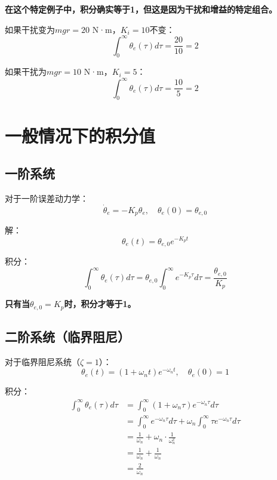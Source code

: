 \documentclass[12pt,a4paper]{article}
\begin{document}
\textbf{在这个特定例子中，积分确实等于1，但这是因为干扰和增益的特定组合。}

如果干扰变为$mgr = 20$ N·m，$K_i = 10$不变：
\begin{equation}
\int_0^{\infty} \theta_e(\tau) d\tau = \frac{20}{10} = 2
\end{equation}

如果干扰为$mgr = 10$ N·m，$K_i = 5$：
\begin{equation}
\int_0^{\infty} \theta_e(\tau) d\tau = \frac{10}{5} = 2
\end{equation}

\section{一般情况下的积分值}

\subsection{一阶系统}

对于一阶误差动力学：
\begin{equation}
\dot{\theta}_e = -K_p \theta_e, \quad \theta_e(0) = \theta_{e,0}
\end{equation}

解：
\begin{equation}
\theta_e(t) = \theta_{e,0} e^{-K_p t}
\end{equation}

积分：
\begin{equation}
\int_0^{\infty} \theta_e(\tau) d\tau = \theta_{e,0} \int_0^{\infty} e^{-K_p \tau} d\tau = \frac{\theta_{e,0}}{K_p}
\end{equation}

\textbf{只有当$\theta_{e,0} = K_p$时，积分才等于1。}

\subsection{二阶系统（临界阻尼）}

对于临界阻尼系统（$\zeta = 1$）：
\begin{equation}
\theta_e(t) = (1 + \omega_n t)e^{-\omega_n t}, \quad \theta_e(0) = 1
\end{equation}

积分：
\begin{align}
\int_0^{\infty} \theta_e(\tau) d\tau &= \int_0^{\infty} (1 + \omega_n \tau)e^{-\omega_n \tau} d\tau \\
&= \int_0^{\infty} e^{-\omega_n \tau} d\tau + \omega_n \int_0^{\infty} \tau e^{-\omega_n \tau} d\tau \\
&= \frac{1}{\omega_n} + \omega_n \cdot \frac{1}{\omega_n^2} \\
&= \frac{1}{\omega_n} + \frac{1}{\omega_n} \\
&= \frac{2}{\omega_n}
\end{align}
\end{document}
